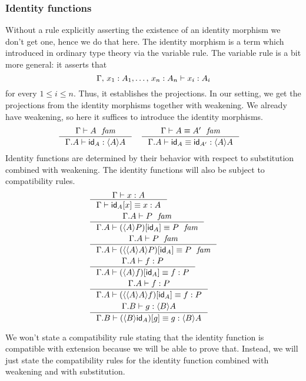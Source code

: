 \subsubsection{Identity functions}
Without a rule explicitly asserting the existence of an identity morphism we don't
get one, hence we do that here. The identity morphism is a term which introduced
in ordinary type theory via the variable rule. The variable rule is a bit more
general: it asserts that
\begin{equation*}
\jterm{\Gamma,\,x_1:A_1,\ldots,\,x_n:A_n}{A_i}{x_i}
\end{equation*}
for every $1\leq i\leq n$. Thus, it establishes the projections. In our setting,
we get the projections from the identity morphisms together with weakening. We
already have weakening, so here it suffices to introduce the identity morphisms.
\begin{align}
& \inference{\jfam{\Gamma}{A}}{\jterm{{\Gamma}{A}}{\ctxwk{A}{A}}{\idfunc[A]}}
& & \inference{\jfameq{\Gamma}{A}{A'}}{\jtermeq{{\Gamma}{A}}{\ctxwk{A}{A}}{\idfunc[A]}{\idfunc[A']}}
\end{align}
Identity functions are determined by their behavior with respect to substitution combined with
weakening. The identity functions will also be subject to compatibility rules.
\begin{align}
& \inference{\jterm{\Gamma}{A}{x}}{\jtermeq{\Gamma}{A}{\subst{x}{\idfunc[A]}}{x}}\label{idfunc-subst-defn}\\
& \inference{\jfam{{\Gamma}{A}}{P}}{\jfameq{{\Gamma}{A}}{\subst{\idfunc[A]}{\ctxwk{A}{P}}}{P}}\label{idfunc-wk-defn}\\
& \inference{\jfam{{\Gamma}{A}}{P}}{\jfameq{{\Gamma}{A}}{\subst{\idfunc[A]}{\ctxwk{{A}{A}}{P}}}{P}}\label{idfunc-wk-defn2}\\
& \inference{\jterm{{\Gamma}{A}}{P}{f}}{\jtermeq{{\Gamma}{A}}{P}{\subst{\idfunc[A]}{\ctxwk{A}{f}}}{f}}\label{idfunc-precomp} \\
& \inference{\jterm{{\Gamma}{A}}{P}{f}}{\jtermeq{{\Gamma}{A}}{P}{\subst{\idfunc[A]}{\ctxwk{{A}{A}}{f}}}{f}}\label{idfunc-precomp} \\
& \inference{\jterm{{\Gamma}{B}}{\ctxwk{B}{A}}{g}}{\jtermeq{{\Gamma}{B}}{\ctxwk{B}{A}}{\subst{g}{\ctxwk{B}{\idfunc[A]}}}{g}}\label{idfunc-postcomp}
\end{align}

We won't state a compatibility rule stating that the identity function is
compatible with extension because we will be able to prove that. Instead, we
will just state the compatibility rules for the identity function combined with
weakening and with substitution.

